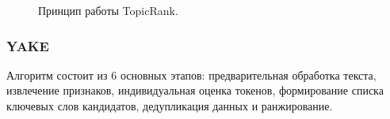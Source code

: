 \documentclass[14pt]{matmex-diploma-custom}
\begin{document}
\begin{figure}[ht]
\begin{center}


\caption{
\label{topicrank}
        Принцип работы TopicRank.}
\end {center}
\end {figure}

%

\subsubsection{YAKE}
Алгоритм состоит из 6 основных этапов: предварительная обработка текста, извлечение признаков, индивидуальная оценка токенов, формирование списка ключевых слов кандидатов, дедупликация данных и ранжирование.
\end{document}
